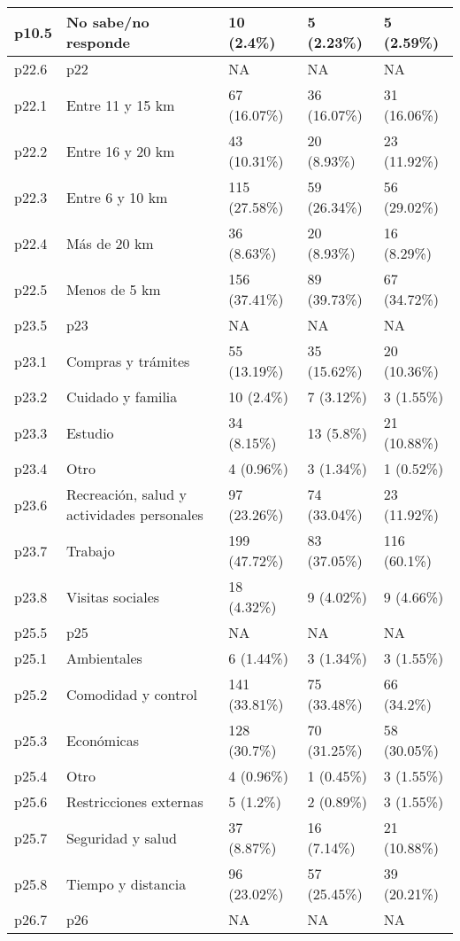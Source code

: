 \begin{table}
{\begin{tabular}[t]{l|l|l|l|l}
\hline
p10.5 & No sabe/no responde & 10 (2.4\%) & 5 (2.23\%) & 5 (2.59\%)\\
\hline
p22.6 & p22 & NA & NA & NA\\
\hline
p22.1 & Entre 11 y 15 km & 67 (16.07\%) & 36 (16.07\%) & 31 (16.06\%)\\
\hline
p22.2 & Entre 16 y 20 km & 43 (10.31\%) & 20 (8.93\%) & 23 (11.92\%)\\
\hline
p22.3 & Entre 6 y 10 km & 115 (27.58\%) & 59 (26.34\%) & 56 (29.02\%)\\
\hline
p22.4 & Más de 20 km & 36 (8.63\%) & 20 (8.93\%) & 16 (8.29\%)\\
\hline
p22.5 & Menos de 5 km & 156 (37.41\%) & 89 (39.73\%) & 67 (34.72\%)\\
\hline
p23.5 & p23 & NA & NA & NA\\
\hline
p23.1 & Compras y trámites & 55 (13.19\%) & 35 (15.62\%) & 20 (10.36\%)\\
\hline
p23.2 & Cuidado y familia & 10 (2.4\%) & 7 (3.12\%) & 3 (1.55\%)\\
\hline
p23.3 & Estudio & 34 (8.15\%) & 13 (5.8\%) & 21 (10.88\%)\\
\hline
p23.4 & Otro & 4 (0.96\%) & 3 (1.34\%) & 1 (0.52\%)\\
\hline
p23.6 & Recreación, salud y actividades personales & 97 (23.26\%) & 74 (33.04\%) & 23 (11.92\%)\\
\hline
p23.7 & Trabajo & 199 (47.72\%) & 83 (37.05\%) & 116 (60.1\%)\\
\hline
p23.8 & Visitas sociales & 18 (4.32\%) & 9 (4.02\%) & 9 (4.66\%)\\
\hline
p25.5 & p25 & NA & NA & NA\\
\hline
p25.1 & Ambientales & 6 (1.44\%) & 3 (1.34\%) & 3 (1.55\%)\\
\hline
p25.2 & Comodidad y control & 141 (33.81\%) & 75 (33.48\%) & 66 (34.2\%)\\
\hline
p25.3 & Económicas & 128 (30.7\%) & 70 (31.25\%) & 58 (30.05\%)\\
\hline
p25.4 & Otro & 4 (0.96\%) & 1 (0.45\%) & 3 (1.55\%)\\
\hline
p25.6 & Restricciones externas & 5 (1.2\%) & 2 (0.89\%) & 3 (1.55\%)\\
\hline
p25.7 & Seguridad y salud & 37 (8.87\%) & 16 (7.14\%) & 21 (10.88\%)\\
\hline
p25.8 & Tiempo y distancia & 96 (23.02\%) & 57 (25.45\%) & 39 (20.21\%)\\
\hline
p26.7 & p26 & NA & NA & NA\\

\end{tabular}}
\end{table}
